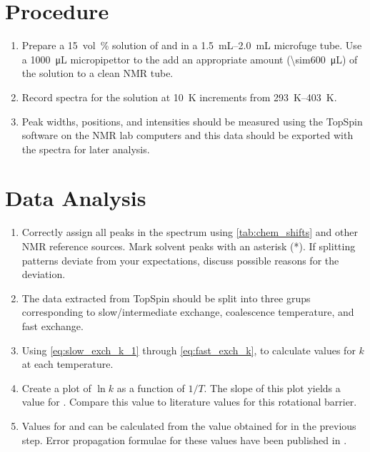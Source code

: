 \section{Procedure} %
\label{sec:procedure}

\begin{enumerate}
	\item Prepare a \SI{15}{vol\percent} solution of  and  in  a \SIrange{1.5}{2.0}{\mL} microfuge tube. 
	Use a \SI{1000}{\uL} micropipettor to the add an appropriate amount (\SI{\sim600}{\uL}) of the solution to a clean NMR tube. 
	\item Record \NMR* spectra for the solution at \SI{10}{\kelvin} increments from \SIrange{293}{403}{\kelvin}. 
	\item Peak widths, positions, and intensities should be measured using the TopSpin software on the NMR lab computers and this data should be exported with the spectra for later analysis. 
\end{enumerate}


\section{Data Analysis} %
\label{sec:data_analysis}

\begin{enumerate}
	\item Correctly assign all peaks in the spectrum using \cref{tab:chem_shifts} and other NMR reference sources.\autocite{davis1965advanced,pople1959nmr,silverstein2005spec,burdett1964a,rogers1956a}
	Mark solvent peaks with an asterisk (*). If splitting patterns deviate from your expectations, discuss possible reasons for the deviation. 
	\item The data extracted from TopSpin should be split into three grups corresponding to slow/intermediate exchange, coalescence temperature, and fast exchange. 
	\item Using \cref{eq:slow_exch_k_1} through \cref{eq:fast_exch_k}, to calculate values for \( k \) at each temperature. 
	\item Create a plot of \( \ln{k} \)  as a function of \( 1/T \). 
  The slope of this plot yields a value for . 
  Compare this value to literature values for this rotational barrier. 
	\item Values for  and  can be calculated from the value obtained for  in the previous step. 
  Error propagation formulae for these values have been published in \textcite{morse94nmr}.
\end{enumerate}

